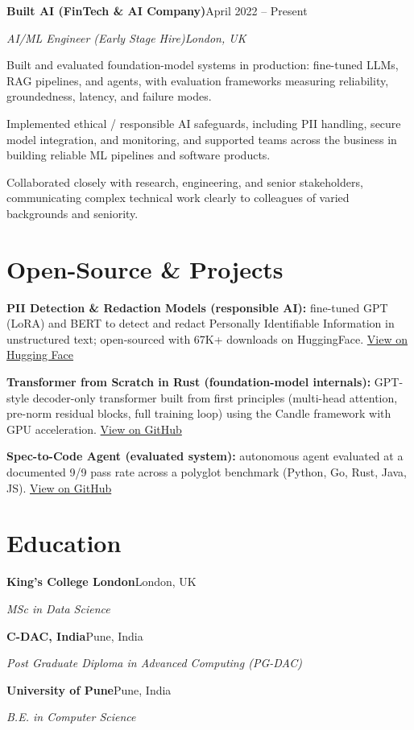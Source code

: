 \documentclass[10pt,a4paper]{article}
\newcommand{\entry}[4]{%
  {\color{company}\bfseries #1}\hfill {\color{muted}#2}\par
  \vspace{1pt}
  {\itshape #3}\hfill {\color{muted}\itshape #4}\par
  \vspace{3pt}%
}
\begin{document}
\entry{Built AI (FinTech \& AI Company)}{April 2022 -- Present}{AI/ML Engineer (Early Stage Hire)}{London, UK}
\begin{tight}
  \item Built and evaluated foundation-model systems in production: fine-tuned LLMs, RAG pipelines, and agents, with evaluation frameworks measuring reliability, groundedness, latency, and failure modes.
  \item Implemented ethical / responsible AI safeguards, including PII handling, secure model integration, and monitoring, and supported teams across the business in building reliable ML pipelines and software products.
  \item Collaborated closely with research, engineering, and senior stakeholders, communicating complex technical work clearly to colleagues of varied backgrounds and seniority.
\end{tight}

\section{Open-Source \& Projects}
\begin{tight}
  \item \textbf{PII Detection \& Redaction Models (responsible AI):} fine-tuned GPT (LoRA) and BERT to detect and redact Personally Identifiable Information in unstructured text; open-sourced with 67K+ downloads on HuggingFace. \href{https://huggingface.co/ab-ai/pii_model}{View on Hugging Face}
  \item \textbf{Transformer from Scratch in Rust (foundation-model internals):} GPT-style decoder-only transformer built from first principles (multi-head attention, pre-norm residual blocks, full training loop) using the Candle framework with GPU acceleration. \href{https://github.com/abhijeetscode/transformer-rust}{View on GitHub}
  \item \textbf{Spec-to-Code Agent (evaluated system):} autonomous agent evaluated at a documented 9/9 pass rate across a polyglot benchmark (Python, Go, Rust, Java, JS). \href{https://github.com/abhijeetscode/Spec-to-Code-Agent}{View on GitHub}
\end{tight}

\section{Education}
{\color{company}\bfseries King's College London}\hfill {\color{muted}London, UK}\par
{\itshape MSc in Data Science}\par\vspace{2pt}
{\color{company}\bfseries C-DAC, India}\hfill {\color{muted}Pune, India}\par
{\itshape Post Graduate Diploma in Advanced Computing (PG-DAC)}\par\vspace{2pt}
{\color{company}\bfseries University of Pune}\hfill {\color{muted}Pune, India}\par
{\itshape B.E. in Computer Science}\par
\end{document}
